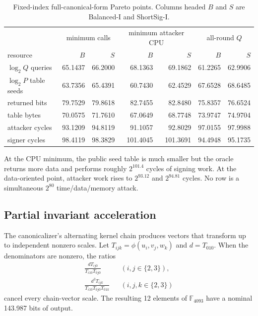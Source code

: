 \documentclass[11pt,a4paper]{article}
\newcommand{\F}{\mathbb F}
\begin{document}
\begin{table}[ht]
\centering
\caption{Fixed-index full-canonical-form Pareto points.  Columns headed $B$
and $S$ are Balanced-I and ShortSig-I.}
\label{tab:fixed}
\begin{tabular}{lrrrrrr}
\toprule
& \multicolumn{2}{c}{minimum calls} & \multicolumn{2}{c}{minimum attacker CPU}
& \multicolumn{2}{c}{all-round $Q$}\\
resource & $B$ & $S$ & $B$ & $S$ & $B$ & $S$\\
\midrule
$\log_2 Q$ queries &65.1437&66.2000&68.1363&69.1862&61.2265&62.9906\\
$\log_2 P$ table seeds &63.7356&65.4391&60.7430&62.4529&67.6528&68.6485\\
returned bits &79.7529&79.8618&82.7455&82.8480&75.8357&76.6524\\
table bytes &70.0575&71.7610&67.0649&68.7748&73.9747&74.9704\\
attacker cycles &93.1209&94.8119&91.1057&92.8029&97.0155&97.9988\\
signer cycles &98.4119&98.3829&101.4045&101.3691&94.4948&95.1735\\
\bottomrule
\end{tabular}
\end{table}

At the CPU minimum, the public seed table is much smaller but the oracle
returns more data and performs roughly $2^{101.4}$ cycles of signing work.  At
the data-oriented point, attacker work rises to $2^{93.12}$ and $2^{94.81}$
cycles.  No row is a simultaneous $2^{80}$ time/data/memory attack.

\subsection{Partial invariant acceleration}

The canonicalizer's alternating kernel chain produces vectors that transform
up to independent nonzero scales.  Let
$T_{ijk}=\phi(u_i,v_j,w_k)$ and $d=T_{010}$.  When the denominators are
nonzero, the ratios
\begin{align}
 \frac{dT_{ij0}}{T_{i10}T_{0j0}}&& (i,j\in\{2,3\}),\nonumber\\
 \frac{d^2T_{ijk}}{T_{i10}T_{0j0}T_{01k}}&&
   (i,j,k\in\{2,3\})                                  \label{eq:ratios}
\end{align}
cancel every chain-vector scale.  The resulting 12 elements of $\F_{4093}$
have a nominal 143.987 bits of output.
\end{document}

